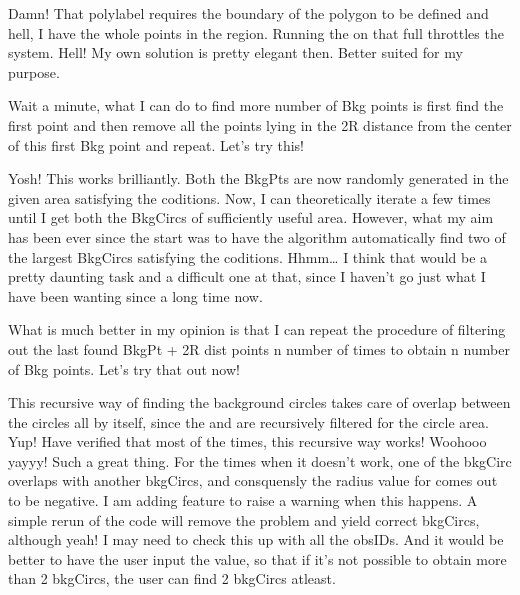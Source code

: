 \documentclass[letterpaper,10pt,english]{sphinxmanual}
\begin{document}
\sphinxAtStartPar
Damn! That polylabel requires the boundary of the polygon to be defined and hell,
I have the whole points in the region. Running the  on that full
throttles the system. Hell!
My own solution is pretty elegant then. Better suited for my purpose.

\sphinxAtStartPar
Wait a minute, what I can do to find more number of Bkg points is first find the first
point and then remove all the points lying in the 2R distance from the center of this
first Bkg point and repeat. Let’s try this!

\sphinxAtStartPar
Yosh! This works brilliantly. Both the BkgPts are now randomly generated in the given
area satisfying the coditions.
Now, I can theoretically iterate a few times until I get both the BkgCircs of sufficiently
useful area. However, what my aim has been ever since the start was to have the algorithm
automatically find two of the largest BkgCircs satisfying the coditions.
Hhmm… I think that would be a pretty daunting task and a difficult one at that,
since I haven’t go just what I have been wanting since a long time now.

\sphinxAtStartPar
What is much better in my opinion is that I can repeat the procedure of filtering out the
last found BkgPt + 2R dist points n number of times to obtain n number of Bkg points.
Let’s try that out now!

\sphinxAtStartPar
This recursive way of finding the background circles takes care of overlap between the
circles all by itself, since the  and  are recursively filtered for
the circle area.
Yup! Have verified that most of the times, this recursive way works! Woohooo yayyy!
Such a great thing.
For the times when it doesn’t work, one of the bkgCirc overlaps with another bkgCircs,
and consquensly the radius value for comes out to be negative.
I am adding feature to raise a warning when this happens. A simple rerun of the code
will remove the problem and yield correct bkgCircs, although yeah! I may need to check
this up with all the obsIDs.
And it would be better to have the user input the  value, so that if it’s
not possible to obtain more than 2 bkgCircs, the user can find 2 bkgCircs atleast.
\end{document}
